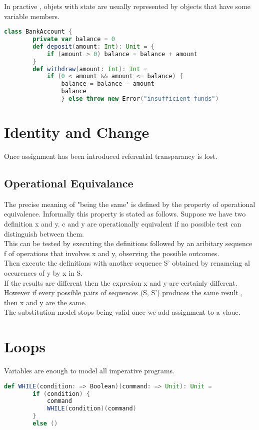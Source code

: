 \documentclass[10pt, a4paper]{report}
\begin{document}
In practive , objets with state are usually represented by objects that have some variable members.

\begin{lstlisting}[language=scala]
	class BankAccount {
		private var balance = 0
		def deposit(amount: Int): Unit = {
			if (amount > 0) balance = balance + amount
		}
		def withdraw(amount: Int): Int =
			if (0 < amount && amount <= balance) {
				balance = balance - amount
				balance
				} else throw new Error("insufficient funds")
\end{lstlisting}

\section{Identity and Change}

Once assignment has been introduced referential transparancy is lost.

\subsection{Operational Equivalance}

The precise meaning of "being the same" is defined by the property of operational equivalence. Informally this property is stated as follows. Suppose we have two definition x and y. c and y are operationally equivalent if no possible test can distinguish between them.\\ This can be tested by executing the definitions followed by an aribitary sequence f of operations that involves x and y, observing the possible outcomes.\\ Then execute the definitions with another sequence S' obtained by renameing al occurences of y by x in S.\\ If the results are different then the expresion x and y are certainly different.\\ However if every possible pairs of sequences (S, S') produces the same result , then x and y are the same.\\ The substitution model stops being valid once we add assignment to a vlaue.

\section{Loops}

Variables are enough to model all imperative programs.

\begin{lstlisting}[language=scala]
	def WHILE(condition: => Boolean)(command: => Unit): Unit =
		if (condition) {
			command
			WHILE(condition)(command)
		}
		else ()
\end{lstlisting}
\end{document}

